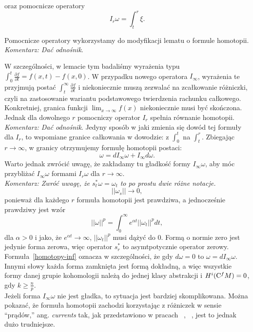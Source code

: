 \documentclass[licencjacka]{pracamgr}
\theoremstyle{definition}
\theoremstyle{definition}
\theoremstyle{plain}
\theoremstyle{plain}
\theoremstyle{plain}
\theoremstyle{plain}
\def\cfm{\ensuremath\mathrm{C}^fM}
\begin{document}
oraz pomocnicze operatory
\[
I_r \omega = \int_t^r \xi. 
\]

Pomocnicze operatory wykorzystamy do modyfikacji lematu o
formule homotopii.
\emph{Komentarz: Dać odnośnik}.

W szczególności, w lemacie tym badaliśmy wyrażenia typu
$\int_0^t \frac{\partial f }{\partial t} = f(x, t) - f(x, 0)$.
W przypadku nowego operatora $I_\infty$, wyrażenia te przyjmują postać
$\int_t^\infty \frac{\partial f }{\partial t}$ i niekoniecznie muszą
zezwalać na zcałkowanie różniczki, czyli na zastosowanie wariantu podstawowego
twierdzenia rachunku całkowego. Konkretniej, granica funkcji $\lim_{x \to \infty} f(x)$
niekoniecznie musi być skończona. Jednak dla dowolnego $r$ pomocniczy
operator $I_r$ spełnia równanie homotopii.
\emph{Komentarz: Dać odnośnik}.
Jedyny sposób w jaki zmienia się dowód tej formuły dla $I_r$, to wspomiane granice
całkowania w dowodzie: z $\int_0^t$ na $\int_t^r$.
Zbiegając $r \to \infty$,  w granicy otrzymujemy formułę homotopii postaci:
\[\label{homotopy-inf}
\omega = dI_\infty \omega + I_\infty d \omega.
\]
Warto jednak zwrócić uwagę, że zakładamy tu gładkość formy $I_\infty \omega$, aby
móc przybliżać  $I_\infty\omega$ 
formami $I_r\omega$ dla $r \rightarrow \infty$. \\

\emph{Komentarz: Zwróć uwagę, że $s_t^\ast \omega  = \omega_t$ to po prostu dwie różne notacje.}
\[
|| \omega_s || \to 0, 
\]
ponieważ dla każdego $r$ formuła homotopii jest prawdziwa, a jednocześnie prawdziwy jest wzór
\[
|| \omega ||^p = \int_0^\infty e^{\alpha t} || \omega_t ||^p dt,
\] dla $\alpha > 0$
i jako, że $e^{\alpha t} \to \infty$, $|| \omega_t ||^p$ musi dążyć do 0. Formą o normie zero jest
jedynie forma zerowa, więc operator $s_r^\ast$ to asymtpotycznie operator zerowy. \\



Formuła~\ref{homotopy-inf} oznacza w szczególności, że gdy $d \omega = 0$ to $\omega = d I_\infty
\omega$. Innymi słowy każda forma zamknięta jest formą dokładną,
a więc wszystkie formy danej grupie kohomologii należą do jednej klasy
abstrakcji i $H^i(\cfm) = 0$, gdy $k \geq \frac{n}{p}$. \\

Jeżeli forma
$I_\infty\omega$ nie jest gładka, to sytuacja jest bardziej skomplikowana.
Można pokazać, że formuła homotopii zachodzi korzystając z różniczek w
sensie ``prądów,'' ang. \emph{currents} tak, jak przedstawiono w
pracach ~\cite{weber}, ~\cite{cheeger}, jest to jednak dużo
trudniejsze. \\
\end{document}
